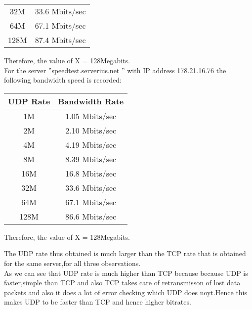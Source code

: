 \documentclass[12pt]{article}
\theoremstyle{remark}
\begin{document}
\begin{itemize}
\begin{table}[H]
\begin{tabular}{|c| c|}
        32M & 33.6 Mbits/sec
\\
64M & 67.1 Mbits/sec
\\
128M & 87.4 Mbits/sec
\\
\hline
    \end{tabular}%
\end{table}
Therefore, the value of X = 128Megabits.\\

For the server ”speedtest.serverius.net ” with IP address 178.21.16.76 the following bandwidth speed is recorded:
\begin{table}[H]
    \begin{tabular}{|c| c|}
         \hline
         \textbf{UDP Rate} &  \textbf{Bandwidth Rate}\\
         \hline
         1M & 1.05 Mbits/sec
\\
         2M &   2.10 Mbits/sec
\\
         4M &   4.19 Mbits/sec
\\
         8M & 8.39 Mbits/sec

\\
        16M &  16.8 Mbits/sec
\\
        
        32M & 33.6 Mbits/sec
\\
64M & 67.1 Mbits/sec\\
128M & 86.6 Mbits/sec\\
\hline
    \end{tabular}%
\end{table}
Therefore, the value of X = 128Megabits.\\
\end{itemize}
The UDP rate thus obtained is much larger than the TCP rate that is obtained for the same server,for all three observations.\\

As we can see that UDP rate is much higher than TCP because because UDP is faster,simple 
than TCP and also TCP takes care of retransmisson of lost data packets and also it does a lot
of error checking which UDP does noyt.Hence this makes UDP to be faster than TCP and hence 
higher bitrates.
\end{document}
